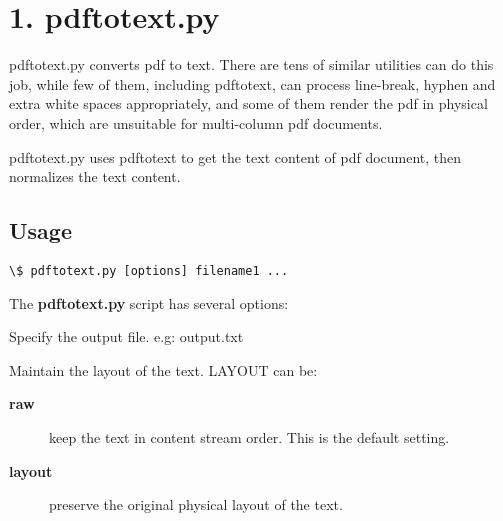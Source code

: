 \documentclass[letterpaper,10pt,oneside]{sphinxmanual}
\begin{document}
\section{1. pdftotext.py}
\label{utility:pdftotext-py}
pdftotext.py converts pdf to text. There are tens of similar utilities can do this job, while few of them, including pdftotext, can process line-break, hyphen and extra white spaces appropriately, and some of them render the pdf in physical order, which are unsuitable for multi-column pdf documents.

pdftotext.py uses pdftotext to get the text content of pdf document, then normalizes the text content.


\subsection{Usage}
\label{utility:usage}
\begin{Verbatim}[commandchars=\\\{\}]
\$ pdftotext.py [options] filename1 ...
\end{Verbatim}

The \textbf{pdftotext.py} script has several options:

\begin{fulllineitems}
\label{utility:cmdoption-pdftotext.py-o}
Specify the output file. e.g: output.txt

\end{fulllineitems}


\begin{fulllineitems}
\label{utility:cmdoption-pdftotext.py-y}
Maintain the layout of the text. LAYOUT can be:
\begin{description}
\item[{\textbf{raw}}] \leavevmode
keep the text in content stream order. This is the default setting.

\item[{\textbf{layout}}] \leavevmode
preserve the original physical layout of the text.

\end{description}

\end{fulllineitems}
\end{document}
